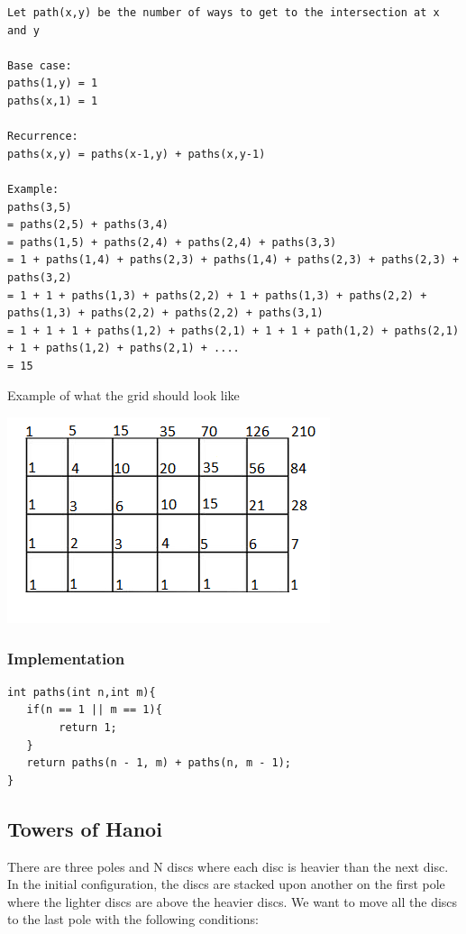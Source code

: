 \documentclass[11pt,oneside]{book}
\makeatletter
\def\maxwidth#1{\ifdim\Gin@nat@width>#1 #1\else\Gin@nat@width\fi}
\makeatother
\begin{document}
\begin{lstlisting}
Let path(x,y) be the number of ways to get to the intersection at x and y

Base case:
paths(1,y) = 1
paths(x,1) = 1

Recurrence:
paths(x,y) = paths(x-1,y) + paths(x,y-1)

Example:
paths(3,5)
= paths(2,5) + paths(3,4)
= paths(1,5) + paths(2,4) + paths(2,4) + paths(3,3)
= 1 + paths(1,4) + paths(2,3) + paths(1,4) + paths(2,3) + paths(2,3) + paths(3,2)
= 1 + 1 + paths(1,3) + paths(2,2) + 1 + paths(1,3) + paths(2,2) + paths(1,3) + paths(2,2) + paths(2,2) + paths(3,1)
= 1 + 1 + 1 + paths(1,2) + paths(2,1) + 1 + 1 + path(1,2) + paths(2,1) + 1 + paths(1,2) + paths(2,1) + ....
= 15
\end{lstlisting}

Example of what the grid should look like

\vspace{5px}\includegraphics[width=\maxwidth{\textwidth}]{recursion_grid2.png}

\subsubsection{Implementation}

\begin{lstlisting}
int paths(int n,int m){
   if(n == 1 || m == 1){
        return 1;
   }
   return paths(n - 1, m) + paths(n, m - 1);
}
\end{lstlisting}

\subsection{Towers of Hanoi}

There are three poles and N discs where each disc is heavier than the next disc. In the initial configuration, the discs are stacked upon another on the first pole where the lighter discs are above the heavier discs. We want to move all the discs to the last pole with the following conditions:
\end{document}
